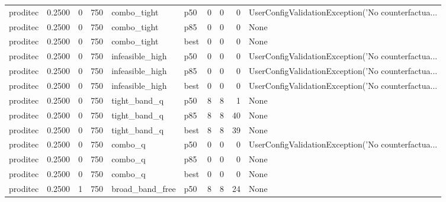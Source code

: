 \begin{tabular}{lrrrllrrrl}
proditec &    0.2500 &    0 &    750 &          combo\_tight &    p50 &               0 &          0 &       0 & UserConfigValidationException('No counterfactua... \\
proditec &    0.2500 &    0 &    750 &          combo\_tight &    p85 &               0 &          0 &       0 &                                               None \\
proditec &    0.2500 &    0 &    750 &          combo\_tight &   best &               0 &          0 &       0 &                                               None \\
proditec &    0.2500 &    0 &    750 &      infeasible\_high &    p50 &               0 &          0 &       0 & UserConfigValidationException('No counterfactua... \\
proditec &    0.2500 &    0 &    750 &      infeasible\_high &    p85 &               0 &          0 &       0 & UserConfigValidationException('No counterfactua... \\
proditec &    0.2500 &    0 &    750 &      infeasible\_high &   best &               0 &          0 &       0 & UserConfigValidationException('No counterfactua... \\
proditec &    0.2500 &    0 &    750 &         tight\_band\_q &    p50 &               8 &          8 &       1 &                                               None \\
proditec &    0.2500 &    0 &    750 &         tight\_band\_q &    p85 &               8 &          8 &      40 &                                               None \\
proditec &    0.2500 &    0 &    750 &         tight\_band\_q &   best &               8 &          8 &      39 &                                               None \\
proditec &    0.2500 &    0 &    750 &              combo\_q &    p50 &               0 &          0 &       0 & UserConfigValidationException('No counterfactua... \\
proditec &    0.2500 &    0 &    750 &              combo\_q &    p85 &               0 &          0 &       0 &                                               None \\
proditec &    0.2500 &    0 &    750 &              combo\_q &   best &               0 &          0 &       0 &                                               None \\
proditec &    0.2500 &    1 &    750 &      broad\_band\_free &    p50 &               8 &          8 &      24 &                                               None \\

\end{tabular}
